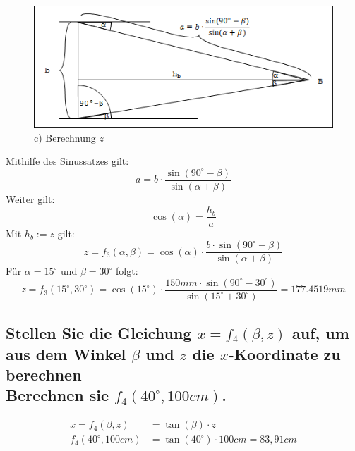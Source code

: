 \documentclass[a4paper,10pt,DIV=14]{scrartcl}
\newcommand{\dg}[1]{#1^\circ}
\begin{document}
\begin{figure}[H]
	\centering
	\includegraphics[width=.95\linewidth]{z.png}
	\caption*{c) Berechnung $z$}
\end{figure}

Mithilfe des Sinussatzes gilt: $$ a = b \cdot \frac{\sin(\dg{90} - \beta)}{\sin(\alpha + \beta)} $$
Weiter gilt: $$ \cos(\alpha) = \frac{h_b}{a} $$
Mit $h_b := z$ gilt:
$$ z = f_3(\alpha, \beta) = \cos(\alpha) \cdot \frac{b \cdot \sin(\dg{90} - \beta)}{\sin(\alpha + \beta)} $$
Für $\alpha = \dg{15}$ und $\beta = \dg{30}$ folgt:
$$ z =  f_3(\dg{15}, \dg{30}) = \cos(\dg{15}) \cdot \frac{150mm \cdot \sin(\dg{90} - \dg{30})}{\sin(\dg{15} + \dg{30})} = 177.4519mm $$

\subsection{Stellen Sie die Gleichung $x = f_4(\beta, z)$ auf, um aus dem Winkel $\beta$ und $z$ die $x$-Koordinate zu berechnen \\ Berechnen sie $f_4(40^\circ, 100cm)$.}

\begin{align*}
x = f_4(\beta, z) &= \tan(\beta) \cdot z \\
f_4(\dg{40}, 100cm) &= \tan(\dg{40}) \cdot 100cm = 83,91cm
\end{align*}
\end{document}

